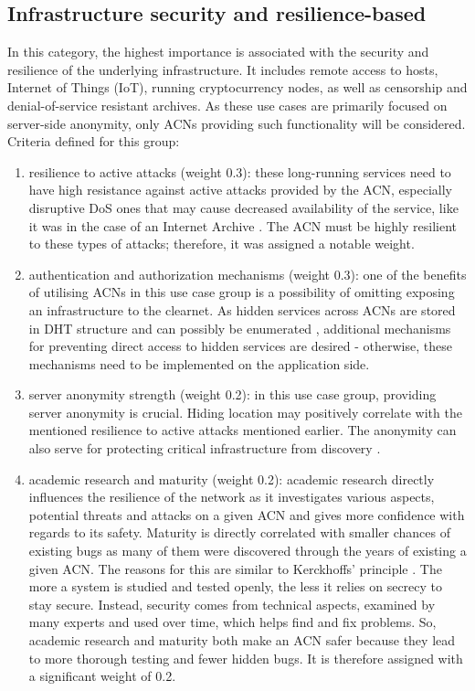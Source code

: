 \subsection{Infrastructure security and resilience-based}
In this category, the highest importance is associated with the security and resilience of the underlying infrastructure. It includes remote access to hosts, Internet of Things (IoT), running cryptocurrency nodes, as well as censorship and denial-of-service resistant archives. As these use cases are primarily focused on server-side anonymity, only ACNs providing such functionality will be considered. Criteria defined for this group:
\begin{enumerate}
    \item resilience to active attacks (weight 0.3): these long-running services need to have high resistance against active attacks provided by the ACN, especially disruptive DoS ones that may cause decreased availability of the service, like it was in the case of an Internet Archive \cite{ddos-web-archive}. The ACN must be highly resilient to these types of attacks; therefore, it was assigned a notable weight.
    \item authentication and authorization mechanisms (weight 0.3): one of the benefits of utilising ACNs in this use case group is a possibility of omitting exposing an infrastructure to the clearnet. As hidden services across ACNs are stored in DHT structure and can possibly be enumerated \cite{Owen2016}, additional mechanisms for preventing direct access to hidden services are desired - otherwise, these mechanisms need to be implemented on the application side.
    \item server anonymity strength (weight 0.2): in this use case group, providing server anonymity is crucial. Hiding location may positively correlate with the mentioned resilience to active attacks mentioned earlier. The anonymity can also serve for protecting critical infrastructure from discovery \cite{torusers}.
    \item academic research and maturity (weight 0.2): academic research directly influences the resilience of the network as it investigates various aspects, potential threats and attacks on a given ACN and gives more confidence with regards to its safety. Maturity is directly correlated with smaller chances of existing bugs as many of them were discovered through the years of existing a given ACN. The reasons for this are similar to Kerckhoffs’ principle \cite{kerckhoffs}. The more a system is studied and tested openly, the less it relies on secrecy to stay secure. Instead, security comes from technical aspects, examined by many experts and used over time, which helps find and fix problems. So, academic research and maturity both make an ACN safer because they lead to more thorough testing and fewer hidden bugs. It is therefore assigned with a significant weight of 0.2.
\end{enumerate}
